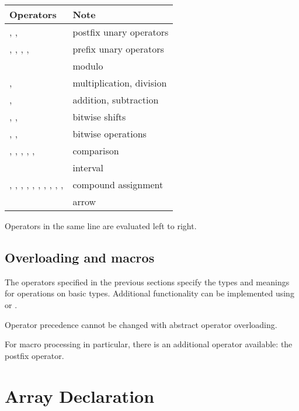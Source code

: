 \begin{center}
\begin{tabular}{| l | l |}
	\hline
	Operators & Note \\ \hline
	\expr{!}, \expr{++}, \expr{--} & postfix unary operators \\
	\expr{\textasciitilde}, \expr{!}, \expr{-}, \expr{++}, \expr{--} & prefix unary operators \\
	\expr{\%} & modulo \\
	\expr{*}, \expr{/} & multiplication, division \\
	\expr{+}, \expr{-} & addition, subtraction \\
	\expr{<<}, \expr{>>}, \expr{>>>} & bitwise shifts \\
	\expr{\&}, \expr{|}, \expr{\^} & bitwise operations \\
	\expr{==}, \expr{!=}, \expr{<}, \expr{<=}, \expr{>}, \expr{>=} & comparison \\
	\expr{...} & interval \\
	\expr{\%=}, \expr{*=}, \expr{/=}, \expr{+=}, \expr{-=}, \expr{<<=}, \expr{>>=}, \expr{>>>=}, \expr{\&=}, \expr{|=}, \expr{\^=} & compound assignment \\
	\expr{=>} & arrow
\end{tabular}
\end{center}

Operators in the same line are evaluated left to right.


\subsection{Overloading and macros}
\label{expression-operators-overloading}

The operators specified in the previous sections specify the types and meanings for operations on basic types. Additional functionality can be implemented using  or .

Operator precedence cannot be changed with abstract operator overloading.

For macro processing in particular, there is an additional operator available: the postfix \expr{!} operator.


\section{Array Declaration}
\label{expression-array-declaration}

